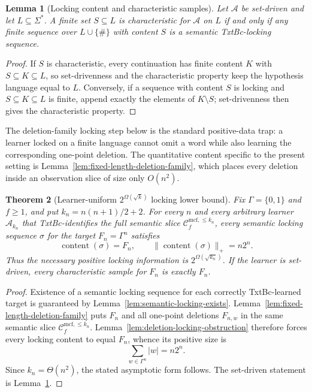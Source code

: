 \documentclass[11pt,a4paper]{article}
\numberwithin{equation}{section}
\theoremstyle{plain}
\newtheorem{theorem}{Theorem}[section]
\newtheorem{lemma}[theorem]{Lemma}
\theoremstyle{definition}
\theoremstyle{remark}
\newcommand{\Clatent}[2]{\mathcal{C}^{\mathrm{mcf},\le #2}_{#1}}
\begin{document}
\begin{lemma}[Locking content and characteristic samples]
\label{lem:locking-characteristic-bridge}
Let \(\mathcal A\) be set-driven and let \(L\subseteq\Sigma^*\).
A finite set \(S\subseteq L\) is characteristic for \(\mathcal A\) on \(L\)
if and only if any finite sequence over \(L\cup\{\#\}\) with content \(S\)
is a semantic TxtBc-locking sequence.
\end{lemma}

\begin{proof}
If \(S\) is characteristic, every continuation has finite content
\(K\) with \(S\subseteq K\subseteq L\), so set-drivenness and the
characteristic property keep the hypothesis language equal to \(L\).
Conversely, if a sequence with content \(S\) is locking and
\(S\subseteq K\subseteq L\) is finite, append exactly the elements of
\(K\setminus S\); set-drivenness then gives the characteristic property.
\end{proof}

The deletion-family locking step below is the standard positive-data trap:
a learner locked on a finite language cannot omit a word while also learning
the corresponding one-point deletion.  The quantitative content specific to
the present setting is Lemma~\ref{lem:fixed-length-deletion-family}, which
places every deletion inside an observation slice of size only $O(n^2)$.

\begin{theorem}[Learner-uniform \(2^{\Omega(\sqrt{k})}\) locking lower bound]
\label{thm:no-uniform-polynomial-k-data}
Fix \(\Gamma=\{0,1\}\) and \(f\ge1\), and put
\(k_n=n(n+1)/2+2\).  For every \(n\) and every arbitrary learner
\(\mathcal A_{k_n}\) that TxtBc-identifies the full semantic slice
\(\Clatent{f}{k_n}\), every semantic locking sequence \(\sigma\) for the
target \(F_n=\Gamma^n\) satisfies
\[
  \operatorname{content}(\sigma)=F_n,
  \qquad
  \|\operatorname{content}(\sigma)\|_+=n2^n.
\]
Thus the necessary positive locking information is
\(2^{\Omega(\sqrt{k_n})}\).  If the learner is set-driven, every
characteristic sample for \(F_n\) is exactly \(F_n\).
\end{theorem}

\begin{proof}
Existence of a semantic locking sequence for each correctly TxtBc-learned target
is guaranteed by Lemma~\ref{lem:semantic-locking-exists}.  Lemma~\ref{lem:fixed-length-deletion-family} puts \(F_n\) and all one-point
deletions \(F_{n,w}\) in the same semantic slice
\(\Clatent{f}{k_n}\).  Lemma~\ref{lem:deletion-locking-obstruction} therefore
forces every locking content to equal \(F_n\), whence its positive size is
\[
  \sum_{w\in\Gamma^n}|w|=n2^n.
\]
Since \(k_n=\Theta(n^2)\), the stated asymptotic form follows.  The set-driven
statement is Lemma~\ref{lem:locking-characteristic-bridge}.
\end{proof}
\end{document}
